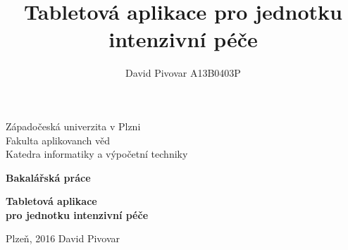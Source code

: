 \documentclass[12pt, a4paper]{report}
\title{Tabletová aplikace pro jednotku intenzivní péče}
\author{David Pivovar A13B0403P}
\begin{document}
\begin{titlepage}

\begin{center}
	
	{\fontsize{22}{0} \selectfont
		Západočeská univerzita v Plzni\\
		Fakulta aplikovanch věd\\
		Katedra informatiky a výpočetní techniky\\
	}
	
	\vfill
	\vfill
	
	{\fontsize{28}{0} \textbf{
		Bakalářská práce\\
	}}
	
	\vfill
	
	{\fontsize{36}{0} \textbf{
		Tabletová aplikace\\pro jednotku intenzivní péče
	}}

\end{center}

\vfill
\vfill
\vfill
\vfill

\begin{flushleft}

	{\fontsize{16}{0} \selectfont
		Plzeň, 2016
		\hfill
		David Pivovar
	}
	
\end{flushleft}

\end{titlepage}


\tableofcontents







%


\end{document}
